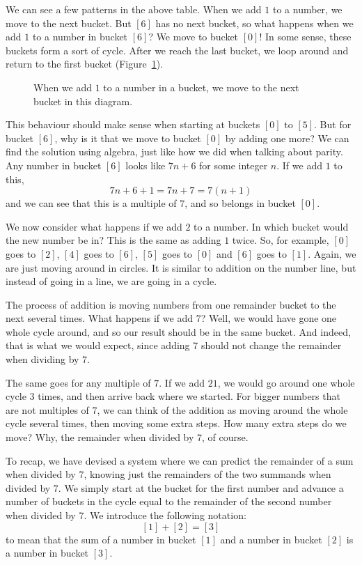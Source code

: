 \documentclass[a4paper,10pt]{report}
\begin{document}
We can see a few patterns in the above table. When we add \(1\) to a number, we
move to the next bucket. But \([6]\) has no next bucket, so what happens when
we add \(1\) to a number in bucket \([6]\)? We move to bucket \([0]\)! In some
sense, these buckets form a sort of cycle. After we reach the last bucket, we
loop around and return to the first bucket (Figure~\ref{ma:equiv-class-cycle}).

\begin{figure}

 \caption{When we add \(1\) to a number in a bucket, we move to the next bucket
 in this diagram.}

 \label{ma:equiv-class-cycle}
\end{figure}

This behaviour should make sense when starting at buckets \([0]\) to \([5]\).
But for bucket \([6]\), why is it that we move to bucket \([0]\) by adding one
more? We can find the solution using algebra, just like how we did when talking
about parity. Any number in bucket \([6]\) looks like \(7n+6\) for some integer
\(n\). If we add \(1\) to this, \[ 7n+6 + 1 = 7n+7 = 7(n+1) \] and we can see
that this is a multiple of \(7\), and so belongs in bucket \([0]\).

We now consider what happens if we add \(2\) to a number. In which bucket would
the new number be in? This is the same as adding \(1\) twice. So, for example,
\([0]\) goes to \([2]\), \([4]\) goes to \([6]\), \([5]\) goes to \([0]\) and
\([6]\) goes to \([1]\). Again, we are just moving around in circles. It is
similar to addition on the number line, but instead of going in a line, we are
going in a cycle.

The process of addition is moving numbers from one remainder bucket to the next
several times. What happens if we add \(7\)? Well, we would have gone one whole
cycle around, and so our result should be in the same bucket. And indeed, that
is what we would expect, since adding \(7\) should not change the remainder
when dividing by \(7\).

The same goes for any multiple of \(7\). If we add \(21\), we would go around
one whole cycle \(3\) times, and then arrive back where we started. For bigger
numbers that are not multiples of \(7\), we can think of the addition as moving
around the whole cycle several times, then moving some extra steps. How many
extra steps do we move? Why, the remainder when divided by \(7\), of course.

To recap, we have devised a system where we can predict the remainder of a sum
when divided by \(7\), knowing just the remainders of the two \glspl{summand}
when divided by \(7\). We simply start at the bucket for the first number and
advance a number of buckets in the cycle equal to the remainder of the second
number when divided by \(7\). We introduce the following notation: \[ [1] + [2] =
[3] \] to mean that the sum of a number in bucket \([1]\) and a number in
bucket \([2]\) is a number in bucket \([3]\).
\end{document}
